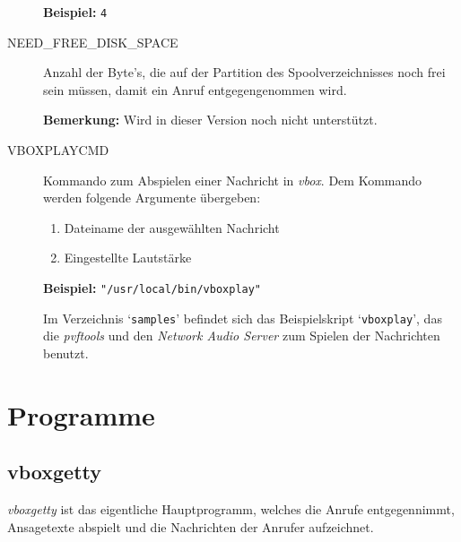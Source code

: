 \begin{description}
{\bf Beispiel:} {\tt 4}



\item[NEED\_FREE\_DISK\_SPACE] \mbox{}



Anzahl der Byte's, die auf der Partition des Spoolverzeichnisses noch
frei sein m\"{u}ssen, damit ein Anruf entgegengenommen wird.

{\bf Bemerkung:} Wird in dieser Version noch nicht unterst\"{u}tzt.



\item[VBOXPLAYCMD] \mbox{}



Kommando zum Abspielen einer Nachricht in {\em vbox\/}. Dem Kommando
werden folgende Argumente \"{u}bergeben:

\begin{enumerate}
\item Dateiname der ausgew\"{a}hlten Nachricht
\item Eingestellte Lautst\"{a}rke
\end{enumerate}


{\bf Beispiel:} {\tt "/usr/local/bin/vboxplay"}

Im Verzeichnis `{\tt samples}' befindet sich das Beispielskript
`{\tt vboxplay}', das die {\em pvftools\/} und den {\em Network Audio
Server\/} zum Spielen der Nachrichten benutzt.



\end{description}







\section{Programme\label{id-programme}}








\subsection{vboxgetty\label{id-vboxgetty}}



{\em vboxgetty\/} ist das eigentliche Hauptprogramm, welches die Anrufe
entgegennimmt, Ansagetexte abspielt und die Nachrichten der Anrufer
aufzeichnet.


